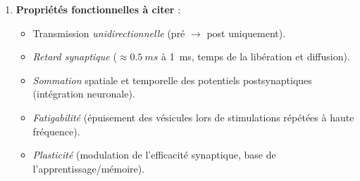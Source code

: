 \documentclass[11pt]{article}
\begin{document}
\begin{methode}
\begin{enumerate}
\begin{enumerate}
\end{enumerate}
\item \textbf{Propriétés fonctionnelles à citer} :
\begin{itemize}
\item Transmission \emph{unidirectionnelle} (pré $\rightarrow$ post uniquement).
\item \emph{Retard synaptique} ($\approx \SI{0,5}{ms}$ à \SI{1}{ms}, temps de la libération et diffusion).
\item \emph{Sommation} spatiale et temporelle des potentiels postsynaptiques (intégration neuronale).
\item \emph{Fatigabilité} (épuisement des vésicules lors de stimulations répétées à haute fréquence).
\item \emph{Plasticité} (modulation de l'efficacité synaptique, base de l'apprentissage/mémoire).
\end{itemize}
\end{enumerate}
\end{methode}
\end{document}
